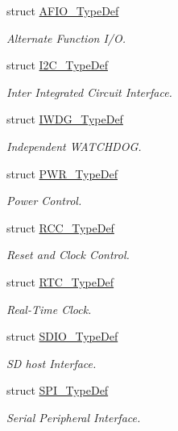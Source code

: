 \begin{DoxyCompactItemize}
struct \mbox{\hyperlink{struct_a_f_i_o___type_def}{A\+F\+I\+O\+\_\+\+Type\+Def}}
\begin{DoxyCompactList}\small\item\em Alternate Function I/O. \end{DoxyCompactList}\item 
struct \mbox{\hyperlink{struct_i2_c___type_def}{I2\+C\+\_\+\+Type\+Def}}
\begin{DoxyCompactList}\small\item\em Inter Integrated Circuit Interface. \end{DoxyCompactList}\item 
struct \mbox{\hyperlink{struct_i_w_d_g___type_def}{I\+W\+D\+G\+\_\+\+Type\+Def}}
\begin{DoxyCompactList}\small\item\em Independent W\+A\+T\+C\+H\+D\+OG. \end{DoxyCompactList}\item 
struct \mbox{\hyperlink{struct_p_w_r___type_def}{P\+W\+R\+\_\+\+Type\+Def}}
\begin{DoxyCompactList}\small\item\em Power Control. \end{DoxyCompactList}\item 
struct \mbox{\hyperlink{struct_r_c_c___type_def}{R\+C\+C\+\_\+\+Type\+Def}}
\begin{DoxyCompactList}\small\item\em Reset and Clock Control. \end{DoxyCompactList}\item 
struct \mbox{\hyperlink{struct_r_t_c___type_def}{R\+T\+C\+\_\+\+Type\+Def}}
\begin{DoxyCompactList}\small\item\em Real-\/\+Time Clock. \end{DoxyCompactList}\item 
struct \mbox{\hyperlink{struct_s_d_i_o___type_def}{S\+D\+I\+O\+\_\+\+Type\+Def}}
\begin{DoxyCompactList}\small\item\em SD host Interface. \end{DoxyCompactList}\item 
struct \mbox{\hyperlink{struct_s_p_i___type_def}{S\+P\+I\+\_\+\+Type\+Def}}
\begin{DoxyCompactList}\small\item\em Serial Peripheral Interface. \end{DoxyCompactList}\item 

\end{DoxyCompactItemize}
